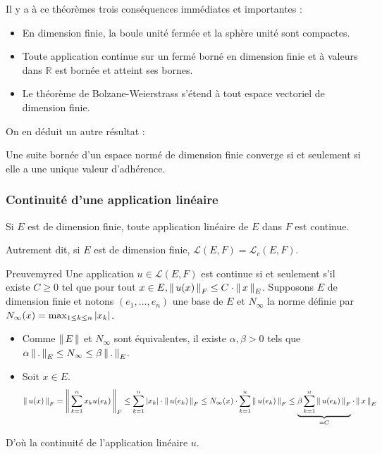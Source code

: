     Il y a à ce théorèmes trois conséquences immédiates et importantes :
    \begin{itemize}
        \item En dimension finie, la boule unité fermée et la sphère unité sont compactes.
        \item Toute application continue sur un fermé borné en dimension finie et à valeurs dans $\mathbb{R}$ est bornée et atteint ses bornes.
        \item Le théorème de Bolzane-Weierstrass s’étend à tout espace vectoriel de dimension finie.
    \end{itemize}

    On en déduit un autre résultat : 

    \begin{coro}{}{}
        Une suite bornée d’un espace normé de dimension finie converge si et seulement si elle a une unique valeur d’adhérence.
    \end{coro}

    \subsubsection{Continuité d’une application linéaire}

    \begin{theo}{}{}
        Si $E$ est de dimension finie, toute application linéaire de $E$ dans $F$ est continue.
    \end{theo}

    Autrement dit, si $E$ est de dimension finie, $\mathcal{L}(E,F) = \mathcal{L}_c(E,F)$.

    \begin{demo}{Preuve}{myred}
        Une application $u \in \mathcal{L}(E,F)$ est continue si et seulement s’il existe $C \geq 0$ tel que pour tout $x \in E, \left\lVert\,u(x)\,\right\rVert_F \leq C \cdot \left\lVert\,x\,\right\rVert_E$. Supposons $E$ de dimension finie et notons $(e_1,\ldots,e_n)$ une base de $E$ et $N_{\infty}$ la norme définie par $N_{\infty}(x) = \max_{1 \leq k \leq n} \left\lvert x_k\right\rvert$. 
        \begin{itemize}
            \item Comme $\left\lVert\,E\,\right\rVert$ et $N_{\infty}$ sont équivalentes, il existe $\alpha, \beta > 0$ tels que $\alpha \left\lVert\,.\,\right\rVert_E \leq N_{\infty} \leq \beta \left\lVert\,.\,\right\rVert_E$.
            \item Soit $x \in E$.
            \[ \left\lVert\,u(x)\,\right\rVert_F = \left\lVert\,\sum_{k=1}^n x_k u(e_k)\,\right\rVert_F \leq \sum_{k=1}^n \left\lvert x_k\right\rvert \cdot \left\lVert\,u(e_k)\,\right\rVert_F \leq N_{\infty}(x) \cdot \sum_{k=1}^n \left\lVert\,u(e_k)\,\right\rVert_F \leq \underbrace{\beta \sum_{k=1}^n \left\lVert\,u(e_k)\,\right\rVert_F}_{= C} \cdot \left\lVert\,x\,\right\rVert_E \]
        \end{itemize}
        D’où la continuité de l’application linéaire $u$.
    \end{demo}

